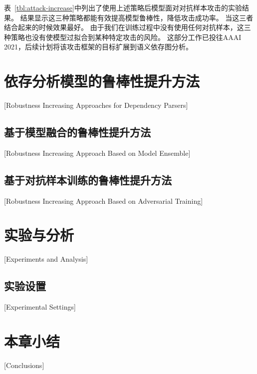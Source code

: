 表~\ref{tbl:attack-increase}中列出了使用上述策略后模型面对对抗样本攻击的实验结果。
结果显示这三种策略都能有效提高模型鲁棒性，降低攻击成功率。
当这三者结合起来的时候效果最好。
由于我们在训练过程中没有使用任何对抗样本，这三种策略也没有使模型过拟合到某种特定攻击的风险。
这部分工作已投往AAAI 2021，后续计划将该攻击框架的目标扩展到语义依存图分析。


\section{依存分析模型的鲁棒性提升方法}[Robustness Increasing Approaches for Dependency Parsers]

\subsection{基于模型融合的鲁棒性提升方法}[Robustness Increasing Approach Based on Model Ensemble]

\subsection{基于对抗样本训练的鲁棒性提升方法}[Robustness Increasing Approach Based on Adversarial Training]


\section{实验与分析}[Experiments and Analysis]

\subsection{实验设置}[Experimental Settings]


\section{本章小结}[Conclusions]


